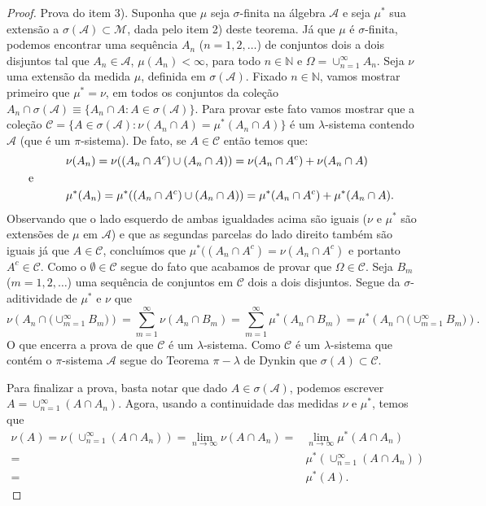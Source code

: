 \begin{proof}
Prova do item 3). 
Suponha que $ \mu$ seja $\sigma$-finita 
na álgebra $\mathcal{A}$ e seja
$\mu^*$ sua extensão a $\sigma(\mathcal{A}) \subset \mathcal{M}$, 
dada pelo item 2) deste teorema. Já que $\mu$ é $\sigma$-finita, podemos
encontrar uma sequência $A_n$ ($n=1,2,\ldots$) de conjuntos
dois a dois disjuntos tal que 
$A_n\in \mathcal{A}$, $\mu(A_n)<\infty$, para todo $n\in\mathbb{N}$ e 
$\Omega = \cup_{n=1}^{\infty} A_n$. 
Seja $\nu$ uma extensão da medida $\mu$, definida em $\sigma(\mathcal{A})$.
Fixado $n\in\mathbb{N}$, vamos mostrar primeiro que $\mu^{*} = \nu$, 
em todos os conjuntos da coleção 
$
A_n\cap \sigma(\mathcal{A}) \equiv \{ A_n\cap A: A\in\sigma(\mathcal{A})\}.
$
Para provar este fato vamos mostrar que a coleção 
$
\mathcal{C} = \{ A\in \sigma(\mathcal{A}) : \nu(A_n\cap A) = \mu^*(A_n\cap A)\}
$
é um $\lambda$-sistema contendo $\mathcal{A}$ (que é um $\pi$-sistema). 
De fato, se $A \in\mathcal{C}$ então temos que: 
\begin{align*}
	&\nu(A_n) =
	\nu((A_n\cap A^c) \cup (A_n\cap A)) 
	= 
	\nu(A_n\cap A^c)+ \nu(A_n\cap A)
\\
\text{e}\hspace*{1cm}&
\\
	&\mu^*(A_n) =
	\mu^*((A_n\cap A^c) \cup (A_n\cap A)) 
	= 
	\mu^*(A_n\cap A^c)+ \mu^*(A_n\cap A).
\end{align*}
Observando que o lado esquerdo de ambas igualdades acima são iguais
($\nu$ e $\mu^*$ são extensões de $\mu$ em $\mathcal{A}$) 
e que as segundas parcelas do lado direito também são iguais 
já que $A\in\mathcal{C}$, concluímos que $\mu^*((A_n\cap A^c)= \nu(A_n\cap A^c)$ 
e portanto $A^c\in\mathcal{C}$. 
Como o $\emptyset\in\mathcal{C}$ segue do fato que acabamos de provar que
$\Omega\in\mathcal{C}$. 
Seja $B_m$ ($m=1,2,\ldots$) uma sequência de conjuntos em 
$\mathcal{C}$ dois a dois disjuntos. Segue da $\sigma$-aditividade
de $\mu^*$ e $\nu$ que 
$$
\nu\left( A_n \cap \big(\cup_{m=1}^{\infty}B_m\big) \right)
=
\sum_{m=1}^{\infty} \nu\left( A_n \cap B_m \right)
=
\sum_{m=1}^{\infty} \mu^*\left( A_n \cap B_m \right)
=
\mu^*\left( A_n \cap \big(\cup_{m=1}^{\infty}B_m\big) \right).
$$
O que encerra a prova de que $\mathcal{C}$ é um $\lambda$-sistema.
Como $\mathcal{C}$ é um $\lambda$-sistema que contém o $\pi$-sistema
$\mathcal{A}$ segue do Teorema $\pi-\lambda$ de Dynkin que 
$\sigma(A)\subset \mathcal{C}$.


Para finalizar a prova, basta notar que dado $A\in \sigma(\mathcal{A})$, 
podemos escrever
$A=\cup_{n=1}^{\infty} (A\cap A_n)$.
Agora, usando a continuidade das medidas $\nu$ e $\mu^*$,
temos que  
\begin{align*}
\nu(A) = \nu\left( \cup_{n=1}^{\infty} (A\cap A_n) \right)
	   = \lim_{n\to\infty} \nu(A\cap A_n)
	   =& \lim_{n\to\infty} \mu^{*}(A\cap A_n)
	   \\[0.2cm]
	   =& \mu^*( \cup_{n=1}^{\infty} (A\cap A_n) )
	   \\[0.2cm]
	   =& \mu^*(A).
\end{align*}
\end{proof}
